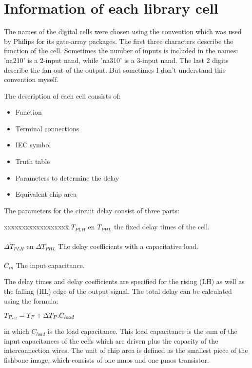 \section{Information of each library cell}

The names of the digital cells were chosen using the convention which was
used by Philips for its gate-array packages. The first three
characters describe the function of the cell. Sometimes the number of inputs
is included in the names: 'na210' is a 2-input nand, while 'na310' is a
3-input nand. The last 2 digits describe the fan-out of the output. But
sometimes I don't understand this convention myself.

The description of each cell consists of:
\begin{itemize}
\item
Function 
\item
Terminal connections
\item
IEC symbol
\item
Truth table
\item
Parameters to determine the delay
\item
Equivalent chip area
\end{itemize}

The parameters for the circuit delay consist of three parts:
\begin{tabbing}
xxxxxxxxxxxxxxxxxx\=\kill
$T_{PLH}$ en $T_{PHL}$\> the fixed delay times of the cell.\\
\\
${\Delta}T_{PLH}$ en ${\Delta}T_{PHL}$\> The delay coefficients with a
capacitative load.\\
\\
$C_{in}$\> The input capacitance.\\
\end{tabbing}

The delay times and delay coefficients are specified for the rising (LH) as
well as the falling (HL) edge of the output signal. The total delay can be 
calculated using the formula:
\begin{description}
\item
$T_{\it P_{tot}} = T_{\it P} + \Delta T_{\it P}.C_{\it load}$
\end{description}
in which $C_{load}$ is the load capacitance. This load capacitance is the sum
of the input capacitances of the cells which are driven plus the capacity of
the interconnection wires.
The unit of chip area is defined as the smallest piece of the fishbone image,
which consists of one nmos and one pmos transistor.
\clearpage
